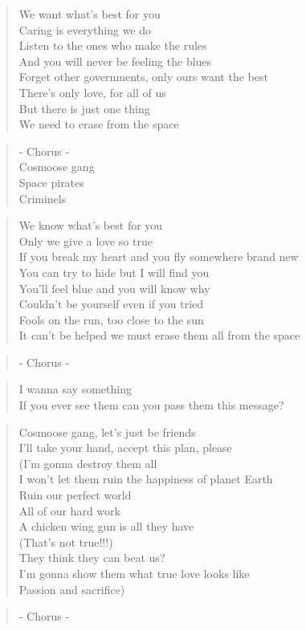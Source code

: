 
\begin{verse}
We want what's best for you\\
Caring is everything we do\\
Listen to the ones who make the rules\\
And you will never be feeling the blues\\
Forget other governments, only ours want the best\\
There's only love, for all of us\\
But there is just one thing\\
We need to erase from the space
\end{verse}

\begin{verse}
- Chorus -\\
Cosmoose gang\\
Space pirates\\
Criminels
\end{verse}

\begin{verse}
We know what's best for you\\
Only we give a love so true\\
If you break my heart and you fly somewhere brand new\\
You can try to hide but I will find you\\
You'll feel blue and you will know why\\
Couldn't be yourself even if you tried\\
Fools on the run, too close to the sun\\
It can't be helped we must erase them all from the space
\end{verse}

\begin{verse}
- Chorus -
\end{verse}


\clearpage
{}


\begin{verse}
I wanna say something\\
If you ever see them can you pass them this message?
\end{verse}

\begin{verse}
Cosmoose gang, let's just be friends \\
I'll take your hand, accept this plan, please\\
(I'm gonna destroy them all\\
I won't let them ruin the happiness of planet Earth\\
Ruin our perfect world\\
All of our hard work\\
A chicken wing gun is all they have\\
(That's not true!!!)\\
They think they can beat us?\\
I'm gonna show them what true love looks like\\
Passion and sacrifice)
\end{verse}

\begin{verse}
- Chorus -
\end{verse}

\clearpage
